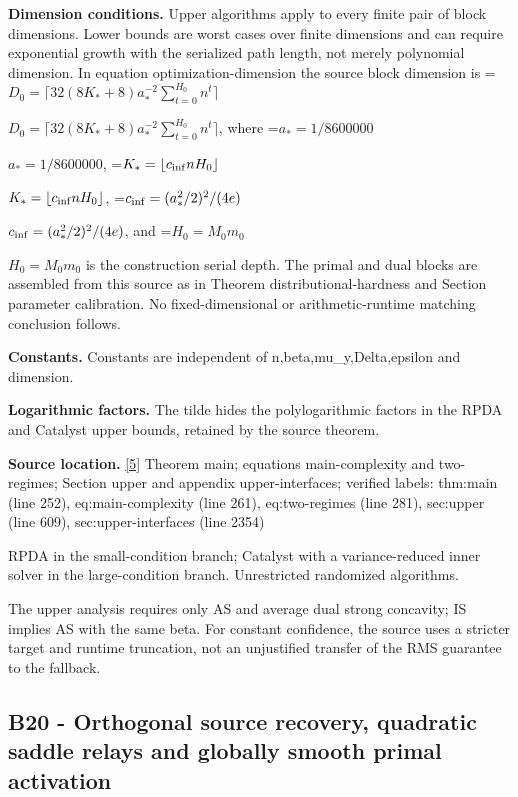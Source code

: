 \documentclass[10pt,a4paper]{article}
\newcommand{\AtlasMath}[1]{\par\begingroup\centering\setbox0=\hbox{$\displaystyle #1$}\ifdim\wd0>1.4\linewidth\typeout{ATLAS WIDE FORMULA: \the\wd0}\fi\ifdim\wd0>\linewidth\resizebox{\linewidth}{!}{\box0}\else\box0\fi\par\endgroup}
\newcommand{\AtlasInlineMath}[1]{\begingroup\setbox0=\hbox{$#1$}\ifdim\wd0>.4\linewidth\endgroup\AtlasMath{#1}\else\endgroup$#1$\fi}
\begin{document}
\textbf{Dimension conditions.} Upper algorithms apply to every finite pair of block dimensions. Lower bounds are worst cases over finite dimensions and can require exponential growth with the serialized path length, not merely polynomial dimension. In equation optimization-dimension the source block dimension is \AtlasInlineMath{D_0=\lceil32(8K_*+8)a_*^{-2}\sum_{t=0}^{H_0}n^t\rceil}, where \AtlasInlineMath{a_*=1/8600000}, \AtlasInlineMath{K_*=\lfloor c_{\rm inf}nH_0\rfloor}, \AtlasInlineMath{c_{\rm inf}=(a_*^2/2)^2/(4e)}, and \AtlasInlineMath{H_0=M_0m_0} is the construction serial depth. The primal and dual blocks are assembled from this source as in Theorem distributional-hardness and Section parameter calibration. No fixed-dimensional or arithmetic-runtime matching conclusion follows.



\textbf{Constants.} Constants are independent of n,beta,mu\_y,Delta,epsilon and dimension.



\textbf{Logarithmic factors.} The tilde hides the polylogarithmic factors in the RPDA and Catalyst upper bounds, retained by the source theorem.



\textbf{Source location.} \href{https://github.com/WU-Wendao/Colombo/blob/main/colombo_sensorium/Complexity_altas/data/sources/colombo/U06/manuscript.pdf}{[5]} Theorem main; equations main-complexity and two-regimes; Section upper and appendix upper-interfaces; verified labels: thm:main (line 252), eq:main-complexity (line 261), eq:two-regimes (line 281), sec:upper (line 609), sec:upper-interfaces (line 2354)



RPDA in the small-condition branch; Catalyst with a variance-reduced inner solver in the large-condition branch. Unrestricted randomized algorithms.



The upper analysis requires only AS and average dual strong concavity; IS implies AS with the same beta. For constant confidence, the source uses a stricter target and runtime truncation, not an unjustified transfer of the RMS guarantee to the fallback.



\subsection{B20 - Orthogonal source recovery, quadratic saddle relays and globally smooth primal activation}
\end{document}
